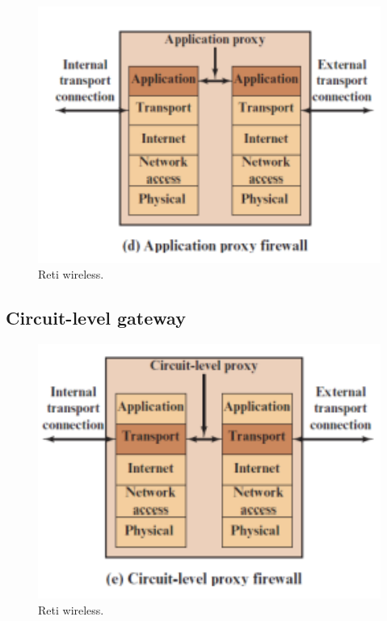 \begin{figure}[h]
    \centering
    \includegraphics[width=1\textwidth]{images/chapter7/7-3.png}
    \caption{Reti wireless.}
    \label{fig:7-3}
\end{figure}

\subsection{Circuit-level gateway}

\begin{figure}[h]
    \centering
    \includegraphics[width=1\textwidth]{images/chapter7/7-4.png}
    \caption{Reti wireless.}
    \label{fig:7-4}
\end{figure}

